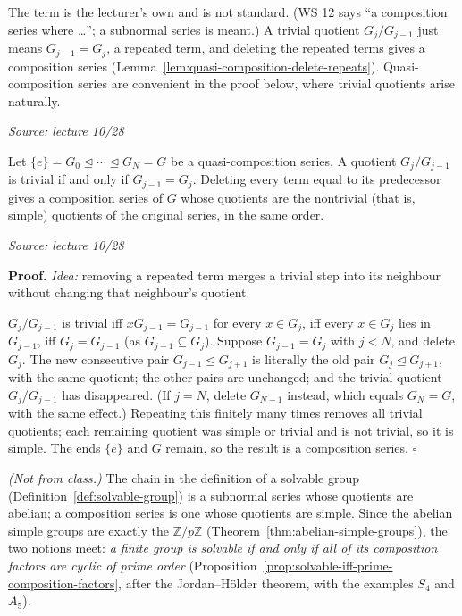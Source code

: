 \documentclass[11pt]{report}
\renewenvironment{proof}[1][Proof]{\noindent\textbf{#1.} }{\hfill$\square$\par\vspace{5pt}}
\newcommand{\srcline}[1]{\par\hfill{\footnotesize\textit{Source: #1}}}
\begin{document}
\begin{rembox}\label{rem:quasi-composition-cleanup}
The term is the lecturer's own and is not standard. (WS 12 says ``a composition series where \ldots''; a subnormal series is meant.) A trivial quotient $G_j/G_{j-1}$ just means $G_{j-1} = G_j$, a repeated term, and deleting the repeated terms gives a composition series (Lemma~\ref{lem:quasi-composition-delete-repeats}). Quasi-composition series are convenient in the proof below, where trivial quotients arise naturally.
\srcline{lecture 10/28}
\end{rembox}

\begin{lembox}\label{lem:quasi-composition-delete-repeats}
Let $\{e\} = G_0 \trianglelefteq \cdots \trianglelefteq G_N = G$ be a quasi-composition series. A quotient $G_j/G_{j-1}$ is trivial if and only if $G_{j-1} = G_j$. Deleting every term equal to its predecessor gives a composition series of $G$ whose quotients are the nontrivial (that is, simple) quotients of the original series, in the same order.
\srcline{lecture 10/28}
\end{lembox}

\begin{proof}
\textit{Idea:} removing a repeated term merges a trivial step into its neighbour without changing that neighbour's quotient.\par
$G_j/G_{j-1}$ is trivial iff $xG_{j-1} = G_{j-1}$ for every $x \in G_j$, iff every $x \in G_j$ lies in $G_{j-1}$, iff $G_j = G_{j-1}$ (as $G_{j-1} \subseteq G_j$). Suppose $G_{j-1} = G_j$ with $j < N$, and delete $G_j$. The new consecutive pair $G_{j-1} \trianglelefteq G_{j+1}$ is literally the old pair $G_j \trianglelefteq G_{j+1}$, with the same quotient; the other pairs are unchanged; and the trivial quotient $G_j/G_{j-1}$ has disappeared. (If $j = N$, delete $G_{N-1}$ instead, which equals $G_N = G$, with the same effect.) Repeating this finitely many times removes all trivial quotients; each remaining quotient was simple or trivial and is not trivial, so it is simple. The ends $\{e\}$ and $G$ remain, so the result is a composition series.
\end{proof}

\begin{rembox}\label{rem:composition-solvable}
\textit{(Not from class.)} The chain in the definition of a solvable group (Definition~\ref{def:solvable-group}) is a subnormal series whose quotients are abelian; a composition series is one whose quotients are simple. Since the abelian simple groups are exactly the $\mathbb{Z}/p\mathbb{Z}$ (Theorem~\ref{thm:abelian-simple-groups}), the two notions meet: \emph{a finite group is solvable if and only if all of its composition factors are cyclic of prime order} (Proposition~\ref{prop:solvable-iff-prime-composition-factors}, after the Jordan--H\"older theorem, with the examples $S_4$ and $A_5$).
\end{rembox}
\end{document}
